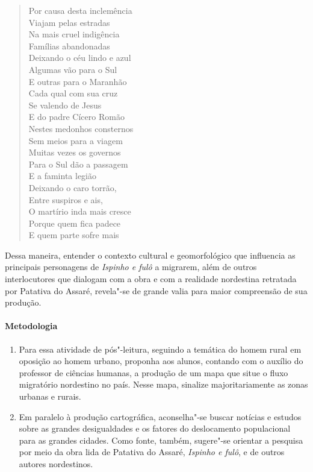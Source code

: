 \documentclass[12pt]{extarticle}
\begin{document}
{\begin{verse}
Por causa desta inclemência\\
Viajam pelas estradas\\
Na mais cruel indigência\\
Famílias abandonadas\\
Deixando o céu lindo e azul\\
Algumas vão para o Sul\\
E outras para o Maranhão\\
Cada qual com sua cruz\\
Se valendo de Jesus\\
E do padre Cícero Romão\\

Nestes medonhos consternos\\
Sem meios para a viagem\\
Muitas vezes os governos\\
Para o Sul dão a passagem\\
E a faminta legião\\
Deixando o caro torrão,\\
Entre suspiros e ais,\\
O martírio inda mais cresce\\
Porque quem fica padece\\
E quem parte sofre mais\\
\end{verse}

Dessa maneira, entender o contexto cultural e geomorfológico que influencia 
as principais personagens de \emph{Ispinho e fulô} a migrarem, além de 
outros interlocutores que dialogam com a obra e com a realidade nordestina 
retratada por Patativa do Assaré, revela"-se de grande valia para maior 
compreensão de sua produção.

\paragraph{Metodologia}

\begin{enumerate}
\item
Para essa atividade de pós"-leitura, seguindo a temática do homem rural 
em oposição ao homem urbano, proponha aos alunos, contando com o auxílio 
do professor de ciências humanas, a produção de um mapa que situe o fluxo 
migratório nordestino no país. Nesse mapa, sinalize majoritariamente as 
zonas urbanas e rurais. 

\item
Em paralelo à produção cartográfica, aconselha"-se buscar notícias e 
estudos sobre as grandes desigualdades e os fatores do deslocamento 
populacional para as grandes cidades. Como fonte, também, sugere"-se 
orientar a pesquisa por meio da obra lida de Patativa do Assaré, 
\emph{Ispinho e fulô}, e de outros autores nordestinos.


\end{enumerate}}
\end{document}
